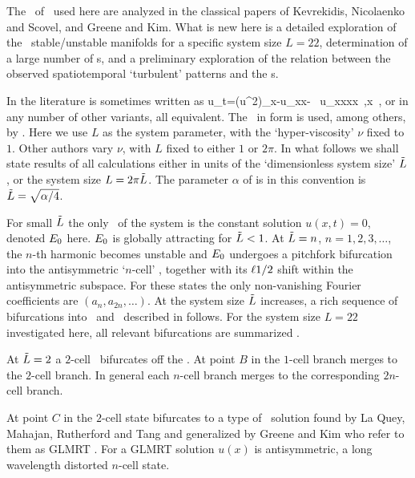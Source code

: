 The \eqva\ of \KSe\ used here are analyzed
in the classical
papers of
Kevrekidis, Nicolaenko and Scovel,
and Greene and Kim. What is new here is
a detailed exploration of the \eqva\ stable/unstable manifolds
for a specific system size $L = 22$, determination
of a large number of \rpo s, and a preliminary
exploration of the relation between the
observed spatiotemporal `turbulent' patterns and
the \rpo s.

In the literature  is sometimes written as
\beq
    u_t=(u^2)_x-u_{xx}- \nu \, u_{xxxx}
    \,,\qquad   x \in [0,L]
    \,,
or in any number of other variants, all equivalent.
The \KSe\ in  form  is used, among others, by
\cite{cross93,Mks86,ks04com}.
Here we use $L$ as the system parameter, with the
`hyper-viscosity' $\nu$ fixed to $1$.
Other authors vary  $\nu$, with $L$ fixed to either $1$ or $2\pi$.
In what follows we shall state results of all
calculations either in units of the `dimensionless system size' $\tilde{L}$,
or the system size $L = 2 \pi \tilde{L}$. The parameter $\alpha$
of  is in this convention is
$\tilde{L}=\sqrt{\alpha/4}$.


For small $\tilde{L}$ the only \eqv\ of the system is the
constant solution $u(x,t)=0$, denoted $E_{0}$ here.
$E_{0}$ is globally attracting
for $\tilde{L}<1$. At $\tilde{L}=n$, $n=1,2,3, \dots$,
the $n$-th harmonic becomes unstable and $E_{0}$
undergoes a pitchfork bifurcation into
the antisymmetric `$n$-cell' \eqv, %
together with its $\ell{1/2}$ shift within the
antisymmetric subspace.
For these states the only non-vanishing Fourier coefficients
are $(a_n,a_{2n},\dots)$.
At the system size $\tilde{L}$ increases, a rich sequence
of bifurcations into \eqva\ and \reqva\ described in
 follows. For the system size
$L=22$ investigated here, all relevant bifurcations are
summarized .

At $\tilde{L}=2$ a $2$-cell \eqv\ bifurcates off the  \eqv.
At point $B$ in  the $1$-cell branch merges
to the $2$-cell branch.  In general each $n$-cell branch merges
to the corresponding $2n$-cell branch.

At point $C$ in 
the $2$-cell state bifurcates to a type of \eqv\ solution
found by La Quey, Mahajan, Rutherford and Tang
and generalized by Greene and Kim who refer to them as GLMRT \eqva.
For a GLMRT solution $u(x)$ is antisymmetric,
a long wavelength distorted $n$-cell state.

